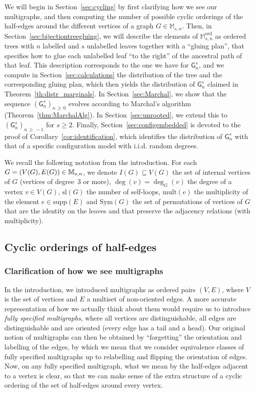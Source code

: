 \documentclass[10pt]{amsart}
\theoremstyle{definition}\newtheorem{defi}[theo]{Definition}\newtheorem{rema}[theo]{Remark}\newtheorem{exam}[theo]{Example}\newtheorem{exem}[theo]{Example}\newtheorem{nota}[theo]{Notation}
\renewcommand{\subset}{\subseteq}
\newcommand{\supp}{\mathrm{supp}}
\newcommand{\ord}{\mathrm{ord}}
\newcommand{\sll}{\mathrm{sl}}
\newcommand{\Sym}{\mathrm{Sym}}
\newcommand{\mult}{\mathrm{mult}}
\newcommand{\sG}{\mathsf{G}}
\newcommand{\M}{\mathbb{M}}
\begin{document}
We will begin in Section~\ref{sec:cycling} by first clarifying how we see our multigraphs, and then computing the number of possible cyclic orderings of the half-edges around the different vertices of a graph $G\in \M_{s,n}$. Then, in Section~\ref{sec:bijectiontreegluing}, we will describe the elements of $\M_{s,n}^{\ord}$ as ordered trees with $n$ labelled and $s$ unlabelled leaves together with a ``gluing plan'', that specifies how to glue each unlabelled leaf ``to the right'' of the ancestral path of that leaf. This description corresponds to the one we have for $\sG^s_{n}$, and we compute in Section~\ref{sec:calculations} the distribution of the tree and the corresponding gluing plan, which then yields the distribution of $\sG^s_{n}$ claimed in Theorem~\ref{th:distr_marginals}. In Section~\ref{sec:Marchal}, we show that the sequence $\left(\sG^s_{n}\right)_{n\,\ge\,0}$ evolves according to Marchal's algorithm (Theorem~\ref{thm:MarchalAlg}). In Section~\ref{sec:unrooted}, we extend this to $(\sG_{n}^s)_{n\,\ge\,-1}$ for $s \ge 2$. Finally, Section~\ref{sec:configembedded} is devoted to the proof of Corollary~\ref{cor:identification}, which identifies the distribution of $\sG^s_{n}$ with that of a specific configuration model with i.i.d. random degrees.

We recall the following notation from the introduction. For each $G=(V(G),E(G))\linebreak\in \M_{s,n}$, we denote $I(G)\subset V(G)$ the set of internal vertices of $G$ (vertices of degree~$3$ or more), $\deg(v) = \deg_G(v)$ the degree of a vertex $v \in V(G)$, $\sll(G)$ the number of self-loops, $\mult(e)$ the multiplicity of the element $e \in \supp(E)$ and $\Sym(G)$ the set of permutations of vertices of $G$ that are the identity on the leaves and that preserve the adjacency relations (with multiplicity).



\subsection{Cyclic orderings of half-edges}\label{sec:structure multigraph}
\label{sec:cycling}
\subsubsection{Clarification of how we see multigraphs}
In the introduction, we introduced multigraphs as ordered pairs $(V,E)$, where $V$ is the set of vertices and $E$ a multiset of non-oriented edges. A more accurate representation of how we actually think about them would require us to introduce \emph{fully specified multigraphs}, where all vertices are distinguishable, all edges are distinguishable and are oriented (every edge has a tail and a head). Our original notion of multigraphs can then be obtained by ``forgetting'' the orientation and labelling of the edges, by which we mean that we consider equivalence classes of fully specified multigraphs up to relabelling and flipping the orientation of edges. Now, on any fully specified multigraph, what we mean by the half-edges adjacent to a vertex is clear, so that we can make sense of the extra structure of a cyclic ordering of the set of half-edges around every vertex.
\end{document}
